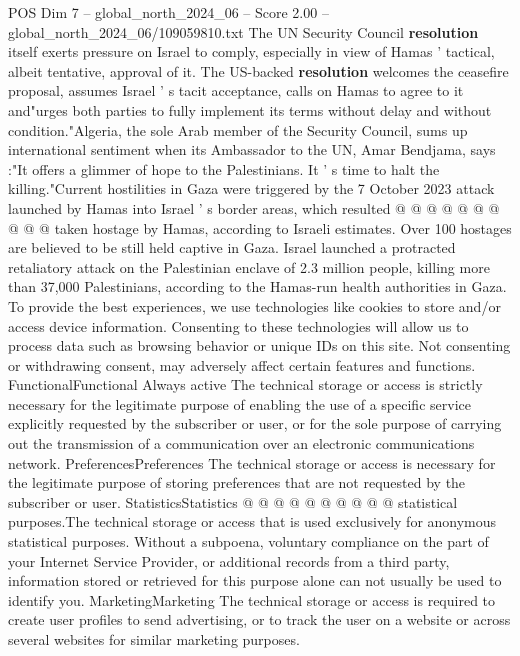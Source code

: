 \begin{textsample}{POS Dim 7 – global\_north\_2024\_06 – Score 2.00 – global\_north\_2024\_06/109059810.txt}
The UN Security Council \textbf{resolution} itself exerts pressure on Israel to comply, especially in view of Hamas ' tactical, albeit tentative, approval of it.
The US-backed \textbf{resolution} welcomes the ceasefire proposal, assumes Israel ' s tacit acceptance, calls on Hamas to agree to it and"urges both parties to fully implement its terms without delay and without condition."Algeria, the sole Arab member of the Security Council, sums up international sentiment when its Ambassador to the UN, Amar Bendjama, says :"It offers a glimmer of hope to the Palestinians.
It ' s time to halt the killing."Current hostilities in Gaza were triggered by the 7 October 2023 attack launched by Hamas into Israel ' s border areas, which resulted @ @ @ @ @ @ @ @ @ @ taken hostage by Hamas, according to Israeli estimates.
Over 100 hostages are believed to be still held captive in Gaza.
Israel launched a protracted retaliatory attack on the Palestinian enclave of 2.3 million people, killing more than 37,000 Palestinians, according to the Hamas-run health authorities in Gaza.
To provide the best experiences, we use technologies like cookies to store and/or access device information.
Consenting to these technologies will allow us to process data such as browsing behavior or unique IDs on this site.
Not consenting or withdrawing consent, may adversely affect certain features and functions.
FunctionalFunctional Always active The technical storage or access is strictly necessary for the legitimate purpose of enabling the use of a specific service explicitly requested by the subscriber or user, or for the sole purpose of carrying out the transmission of a communication over an electronic communications network.
PreferencesPreferences The technical storage or access is necessary for the legitimate purpose of storing preferences that are not requested by the subscriber or user.
StatisticsStatistics @ @ @ @ @ @ @ @ @ @ statistical purposes.The technical storage or access that is used exclusively for anonymous statistical purposes.
Without a subpoena, voluntary compliance on the part of your Internet Service Provider, or additional records from a third party, information stored or retrieved for this purpose alone can not usually be used to identify you.
MarketingMarketing The technical storage or access is required to create user profiles to send advertising, or to track the user on a website or across several websites for similar marketing purposes.

\end{textsample}
